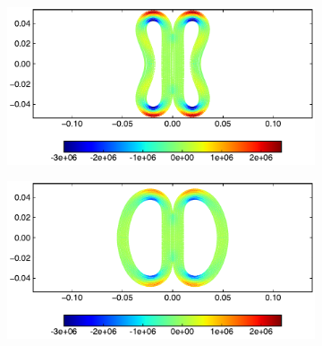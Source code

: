 \begin{figure}[!htpb]
  \begin{subfigure}{0.48\textwidth}
    \centering
    \includegraphics[width=1.0\textwidth]{figures/csph/figures/yan_2021_colliding_rubber_rings/poisson_ratio_0_47/time2}
    \label{fig:rings:ipst-nu-0.47-3}
  \end{subfigure}
%
  \begin{subfigure}{0.48\textwidth}
    \centering
    \includegraphics[width=1.0\textwidth]{figures/csph/figures/yan_2021_colliding_rubber_rings/poisson_ratio_0_47/time3}
    \label{fig:rings:ipst-nu-0.47-4}
  \end{subfigure}


\end{figure}
